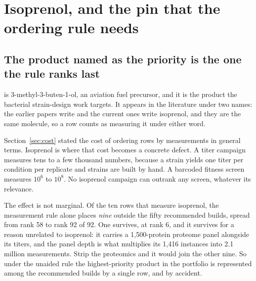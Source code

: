 
\section{Isoprenol, and the pin that the ordering rule needs}\label{sec:iso}

\subsection{The product named as the priority is the one the rule ranks last}

 is 3-methyl-3-buten-1-ol, an aviation fuel precursor, and it is the
product the bacterial strain-design work targets. It appears in the literature under two
names: the earlier papers write  and the current ones write isoprenol,
and they are the same molecule, so a row counts as measuring it under either word.

Section~\ref{sec:cost} stated the cost of ordering rows by measurements in general terms.
Isoprenol is where that cost becomes a concrete defect. A titer campaign measures tens to
a few thousand numbers, because a strain yields one titer per condition per replicate and
strains are built by hand. A barcoded fitness screen measures $10^{6}$ to $10^{8}$. No
isoprenol campaign can outrank any screen, whatever its relevance.

The effect is not marginal. Of the ten rows that measure isoprenol, the measurement rule
alone places \emph{nine} outside the fifty recommended builds, spread from rank 58 to rank
92 of 92. One survives, at rank 6, and it survives for a reason unrelated to isoprenol: it
carries a 1,500-protein proteome panel alongside its titers, and the panel depth is what
multiplies its 1,416 instances into 2.1 million measurements. Strip the proteomics and it
would join the other nine. So under the unaided rule the highest-priority product in the
portfolio is represented among the recommended builds by a single row, and by accident.

